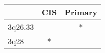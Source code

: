 \begin{tabular}{lcc}
\toprule
{} & CIS & Primary \\
\midrule
3q26.33 &     &       * \\
3q28    &   * &         \\
\bottomrule
\end{tabular}
